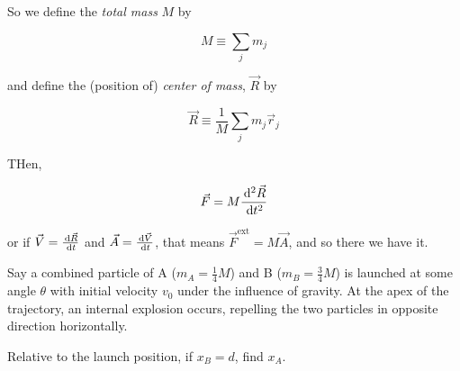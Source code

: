 So we define the \textit{total mass} $M$ by

\begin{equation}
	M \equiv \sum_j m_j
\end{equation}

and define the (position of) \textit{center of mass}, $\vec R$ by

\begin{equation}
	\vec R \equiv \frac{1}{M} \sum_j m_j \vec r_j
\end{equation}

THen,

\begin{equation}
	\vec F = M \frac{\D^2 \vec R}{\D t^2}
\end{equation}

or if $\vec V = \frac{\D \vec R}{\D t}$ and $\vec A = \frac{\D \vec V}{\D t}$, that means $\vec F^\mathrm{ext} = M \vec A$, and so there we have it.

\begin{example}
	Say a combined particle of A ($m_A = \frac{1}{4} M$) and B ($m_B = \frac{3}{4} M$) is launched at some angle $\theta$ with initial velocity $v_0$ under the influence of gravity. At the apex of the trajectory, an internal explosion occurs, repelling the two particles in opposite direction horizontally.

	Relative to the launch position, if $x_{B} = d$, find $x_A$.
\end{example}

